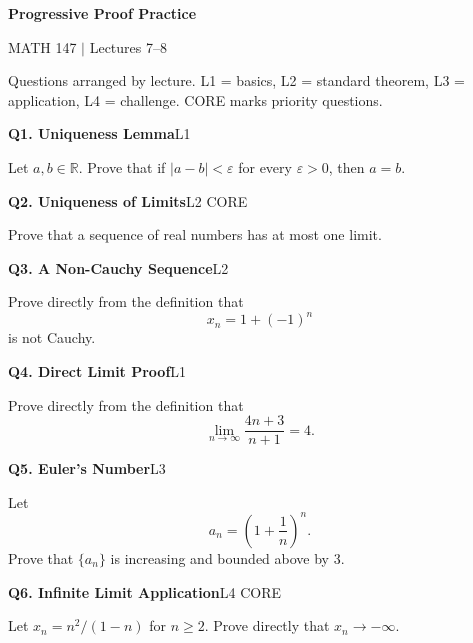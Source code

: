 \documentclass[11pt]{article}
\newcommand{\lecture}[3]{\vspace{10pt}{\small LECTURE #1 \hfill NOTES PP. #2}\par\vspace{4pt}{\Large\bfseries #3}\par\vspace{10pt}}
\newcommand{\q}[3]{\par\vspace{8pt}\textbf{Q#1. #2}\hfill{\small #3}\par}
\begin{document}
{\Large\bfseries Progressive Proof Practice}\par
MATH 147 $|$ Lectures 7--8\par\medskip
Questions arranged by lecture. L1 = basics, L2 = standard theorem, L3 = application, L4 = challenge. CORE marks priority questions.

\lecture{7}{27--30}{Convergence \& Divergence}
\q{1}{Uniqueness Lemma}{L1}
Let $a, b \in \mathbb{R}$. Prove that if $|a - b| < \varepsilon$ for every $\varepsilon > 0$, then $a = b$.
\q{2}{Uniqueness of Limits}{L2 \quad CORE}
Prove that a sequence of real numbers has at most one limit.
\q{3}{A Non-Cauchy Sequence}{L2}
Prove directly from the definition that
\[ x_n = 1 + (-1)^n \]
is not Cauchy.
\newpage
\lecture{8}{31--32}{Algebra of Limits}
\q{4}{Direct Limit Proof}{L1}
Prove directly from the definition that
\[ \lim_{n\to\infty} \frac{4n+3}{n+1} = 4. \]
\q{5}{Euler's Number}{L3}
Let
\[ a_n = \left(1 + \frac{1}{n}\right)^n. \]
Prove that $\{a_n\}$ is increasing and bounded above by 3.
\q{6}{Infinite Limit Application}{L4 \quad CORE}
Let $x_n = n^2/(1-n)$ for $n \geq 2$. Prove directly that $x_n \to -\infty$.
\end{document}
